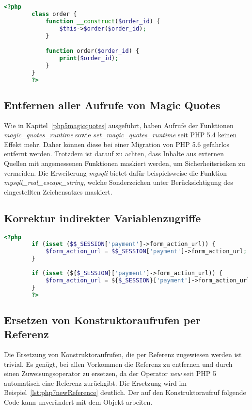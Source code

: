     \begin{lstlisting}[language=php, caption={Beispiel der Ersetzung impliziter Konstruktoren}, label={lst:php7implicit}]
        <?php
        class order {
            function __construct($order_id) {
                $this->$order($order_id);
            }

            function order($order_id) {
                print($order_id);
            }
        }
        ?>
    \end{lstlisting}

    
    \subsection{Entfernen aller Aufrufe von Magic Quotes}
    Wie in Kapitel~\ref{php5magicquotes} ausgeführt, haben Aufrufe der Funktionen \textit{magic\_quotes\_runtime} sowie \textit{set\_magic\_quotes\_runtime} seit \ac{PHP} 5.4 
    keinen Effekt mehr. Daher können diese bei einer Migration von \ac{PHP} 5.6 gefahrlos entfernt werden. Trotzdem ist darauf zu achten, dass Inhalte aus 
    externen Quellen mit angemessenen Funktionen maskiert werden, um Sicherheitsrisiken zu vermeiden. Die Erweiterung \textit{mysqli} bietet dafür beispielsweise 
    die Funktion \textit{mysqli\_real\_escape\_string}, welche Sonderzeichen unter Berücksichtigung des eingestellten Zeichensatzes maskiert.
    
    \subsection{Korrektur indirekter Variablenzugriffe}\label{indirect}
    \begin{lstlisting}[language=php, caption={Anpassung indirekter Variablenzugriffe}, label={lst:php7newReference}]
        <?php
        if (isset ($$_SESSION['payment']->form_action_url)) {
            $form_action_url = $$_SESSION['payment']->form_action_url;
        }
        
        if (isset (${$_SESSION}['payment']->form_action_url)) {
            $form_action_url = ${$_SESSION}['payment']->form_action_url;
        }       
        ?>
    \end{lstlisting}
    
    \subsection{Ersetzen von Konstruktoraufrufen per Referenz}
    Die Ersetzung von Konstruktoraufrufen, die per Referenz zugewiesen werden ist trivial. Es genügt, bei allen Vorkommen die Referenz zu 
    entfernen und durch einen Zuweisungsoperator zu ersetzen, da der Operator \textit{new} seit \ac{PHP} 5 automatisch eine Referenz zurückgibt. 
    Die Ersetzung wird im Beispiel~\ref{lst:php7newReference} deutlich. Der auf den Konstruktoraufruf folgende Code kann unverändert mit dem Objekt arbeiten.
    
